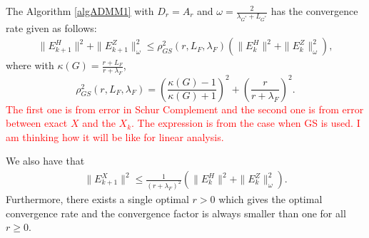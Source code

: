 
\begin{theorem}\label{thm:GS}
The Algorithm \ref{algADMM1} with $D_r = A_r$ and $\omega = \frac{2}{\lambda_{G^*} + L_{G^*}}$ has the convergence rate given as follows: 
\begin{eqnarray}\label{gsrate}
\|E_{k+1}^H\|^2 + \|E_{k+1}^Z\|^2_{\omega} \leq \rho^2_{GS}(r,L_F,\lambda_F) \left ( \|E_{k}^H\|^2 + \|E_{k}^Z\|^2_{\omega}  \right ), 
\end{eqnarray}
where with $\kappa(G) = \frac{r+L_F}{r + \lambda_F}$, 
\begin{equation} 
\rho^2_{GS}(r,L_F,\lambda_F) =  \left ( \frac{\kappa(G) - 1}{\kappa(G) + 1} \right )^2 + \left ( \frac{r}{r+\lambda_F} \right )^2. 
\end{equation} 
\textcolor{red}{The first one is from error in Schur Complement and the second one is from error between exact $X$ and the $X_k$. The expression is from the case when GS is used. I am thinking how it will be like for linear analysis.}


We also have that 
\begin{eqnarray*}
\|E_{k+1}^X\|^2 \leq \frac{1}{(r + \lambda_F)^2} \left ( \|E_k^H\|^2 + \|E_k^Z\|_\omega ^2 \right ). 
\end{eqnarray*}
Furthermore, there exists a single optimal $r > 0$ which gives the optimal convergence rate and the convergence factor is always smaller than one for all $r \geq 0$. 
\end{theorem}
